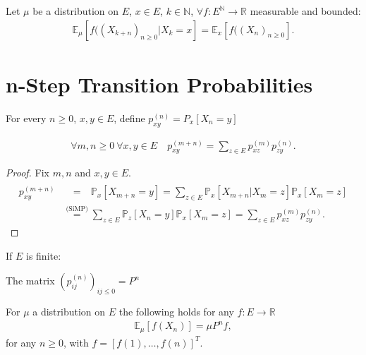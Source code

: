 \begin{cor}
Let $\mu$ be a  distribution on $E$, $x \in E$, $k \in \mathbb{N}$, $\forall f: E^{\mathbb{N}} \to \mathbb{R}$ measurable and bounded:
\begin{align}
	\boxed{	\mathbb{E}_\mu \left[ f((X_{k+n})_{n \geq 0} | X_k =x \right] = \mathbb{E} _x \left[ f((X_n)_{n \geq 0} \right] } . 
\end{align}
\end{cor}

\noindent
\section{n-Step Transition Probabilities}
\begin{defn}
	For every $n\geq0$, $x, y \in E$, define $p_{xy}^{(n)}=P_x[X_n=y]$
\end{defn}

\begin{prop}
\begin{align}
	\forall m,n \geq 0 \ \forall x,y \in E \quad \boxed{ p_{xy}^{(m+n)}= \sum_{z \in E} p_{xz}^{(m)}p_{zy}^{(n)}}.
\end{align}
	
\end{prop}
\begin{proof}
Fix $m,n$ and $x,y \in E$.
	\begin{align}
		p_{xy}^{(m+n)} &\stackrel{\phantom{\textrm{(SiMP)}}}{=} 
			\mathbb{P}_{x} \left[ X_{m+n}=y \right] =
			\sum_{z \in E}^{} \mathbb{P}_{x} \left[ X_{m+n} | X_m = z \right] \mathbb{P}_{x} \left[ X_m = z \right] \\
		&\stackrel{\textrm{(SiMP)}}{=} \sum_{z \in E}^{} \mathbb{P}_{z} \left[ X_n=y \right] \mathbb{P}_{x} \left[ X_m=z \right] = \sum_{z \in E}^{} p_{xz}^{(m)} p_{zy}^{(n)}  	
	.\end{align}
	
\end{proof}


\begin{rmk}[]
	If $E$ is finite:
\itemize
\item The matrix $(p_{ij}^{(n)})_{ij \leq 0}=P^n$
\item For $\mu$ a distribution on $E$ the following holds for any $f:E \to \mathbb{R}$
	\begin{align}
	\mathbb{E}_{\mu} \left[ f(X_n) \right] = \mu P^n f
,\end{align}
for any $n\geq 0$, with $f = [f(1), \ldots ,f(n)]^T$.
\end{rmk}

